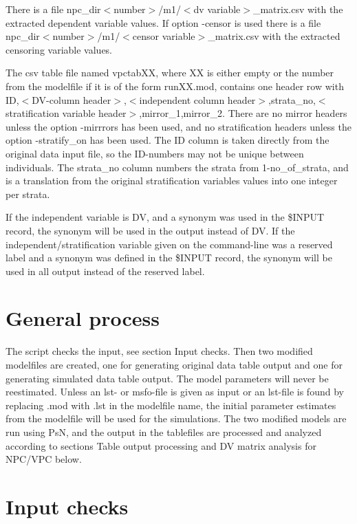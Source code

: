 There is a file npc\_dir$<$number$>$/m1/$<$dv variable$>$\_matrix.csv with the extracted dependent variable values. If option -censor is used there is a file npc\_dir$<$number$>$/m1/$<$censor variable$>$\_matrix.csv with the extracted censoring variable values.

The csv table file named vpctabXX, where XX is either empty or the number from the modelfile if it is of the form runXX.mod, contains one header row with ID,$<$DV-column header$>$,$<$independent column header$>$,strata\_no,$<$stratification variable header$>$,mirror\_1,mirror\_2. There are no mirror headers unless the option -mirrrors has been used, and no stratification headers unless the option -stratify\_on has been used. The ID column is taken directly from the original data input file, so the ID-numbers may not be unique between individuals. The strata\_no column numbers the strata from 1-no\_of\_strata, and is a translation from the original stratification variables values into one integer per strata.

If the independent variable is DV, and a synonym was used in the \$INPUT record, the synonym will be used in the output instead of DV.  If  the independent/stratification variable given on the command-line was a reserved label and a synonym was defined in the \$INPUT record, the synonym will be used in all output instead of the reserved label.

\section{General process}
The script checks the input, see section Input checks. Then two modified modelfiles are created, one for generating original data table output and one for generating simulated data table output. The model parameters will never be reestimated. Unless an lst- or msfo-file is given as input or an lst-file is found by replacing .mod with .lst in the modelfile name, the initial parameter estimates from the modelfile will be used for the simulations. The two modified models are run using PsN, and the output in the tablefiles are processed and analyzed according to sections Table output processing and DV matrix analysis for NPC/VPC below. 

\section{Input checks}

